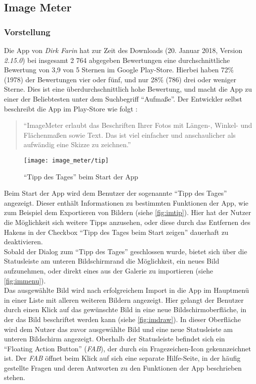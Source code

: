 \subsection{Image Meter}
\subsubsection{Vorstellung}
Die App \im{} von \emph{Dirk Farin} hat zur Zeit des Downloads (20. Januar 2018, Version \emph{2.15.0}) bei insgesamt 2 764 abgegeben Bewertungen eine durchschnittliche Bewertung von 3,9 von 5 Sternen im Google Play-Store.
Hierbei haben 72\% (1978) der Bewertungen vier oder fünf, und nur 28\% (786) drei oder weniger Sterne.
Dies ist eine überdurchschnittlich hohe Bewertung, und macht die App zu einer der Beliebtesten unter dem Suchbegriff ``Aufmaße''.
Der Entwickler selbst beschreibt die App im Play-Store wie folgt \citep{FarinIM}:

\begin{quote}
  ``ImageMeter erlaubt das Beschriften Ihrer Fotos mit Längen-, Winkel- und Flächenmaßen sowie Text.
  Das ist viel einfacher und anschaulicher als aufwändig eine Skizze zu zeichnen.''
\end{quote}

\noindent
\begin{wrapfigure}{R}{0.5\textwidth}
  \centering
  \texttt{[image: image\_meter/tip]}
  \caption{``Tipp des Tages'' beim Start der App}
  \label{fig:imtip}
\end{wrapfigure}
Beim Start der App wird dem Benutzer der sogenannte ``Tipp des Tages'' angezeigt.
Dieser enthält Informationen zu bestimmten Funktionen der App, wie zum Beispiel dem Exportieren von Bildern (siehe \autoref{fig:imtip}).
Hier hat der Nutzer die Möglichkeit sich weitere Tipps anzusehen, oder diese durch das Entfernen des Hakens in der Checkbox ``Tipp des Tages beim Start zeigen'' dauerhaft zu deaktivieren. \\

Sobald der Dialog zum ``Tipp des Tages'' geschlossen wurde, bietet sich über die Statusleiste am unteren Bildschirmrand die Möglichkeit, ein neues Bild aufzunehmen, oder direkt eines aus der Galerie zu importieren (siehe \autoref{fig:immenu}). \\

Das ausgewählte Bild wird nach erfolgreichem Import in die App im Hauptmenü in einer Liste mit alleren weiteren Bildern angezeigt.
Hier gelangt der Benutzer durch einen Klick auf das gewünschte Bild in eine neue Bildschirmoberfläche, in der das Bild beschriftet werden kann (siehe \autoref{fig:imdraw}).
In dieser Oberfläche wird dem Nutzer das zuvor ausgewählte Bild und eine neue Statusleiste am unteren Bildschirm angezeigt.
Oberhalb der Statusleiste befindet sich ein ``Floating Action Button'' (\emph{FAB}), der durch ein Fragezeichen-Icon gekennzeichnet ist.
Der \emph{FAB} öffnet beim Klick auf sich eine separate Hilfe-Seite, in der häufig gestellte Fragen und deren Antworten zu den Funktionen der App beschrieben stehen. \\

